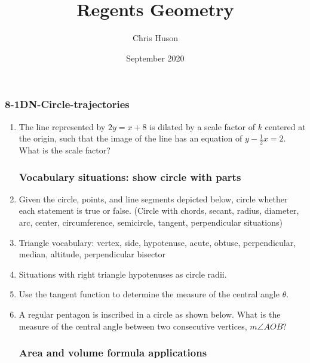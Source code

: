 \documentclass[12pt, twoside]{article}
\title{Regents Geometry}
\author{Chris Huson}
\date{September 2020}
\begin{document}
\subsubsection*{8-1DN-Circle-trajectories}
\begin{enumerate}
\subsubsection*{Sketch the situation on the axes. Mark important values. Do NOT solve!}
 
\item The line represented by $2y=x+8$ is dilated by a scale factor of $k$ centered at the origin, such that the image of the line has an equation of $\displaystyle y-\frac{1}{2}x=2$. What is the scale factor?
  \begin{center}
  \end{center}

\newpage
\subsubsection*{Vocabulary situations: show circle with parts}
    
\item Given the circle, points, and line segments depicted below, circle whether each statement is true or false.
  (Circle with chords, secant, radius, diameter, arc, center, circumference, semicircle, tangent, perpendicular situations)
  
\item Triangle vocabulary: vertex, side, hypotenuse, acute, obtuse, perpendicular, median, altitude, perpendicular bisector
  
\item Situations with right triangle hypotenuses as circle radii.

\item Use the tangent function to determine the measure of the central angle $\theta$.
  
\item A regular pentagon is inscribed in a circle as shown below. What is the measure of the central angle between two consecutive vertices, $m\angle AOB$?
  
\subsubsection*{Area and volume formula applications}


\end{enumerate}
\end{document}
